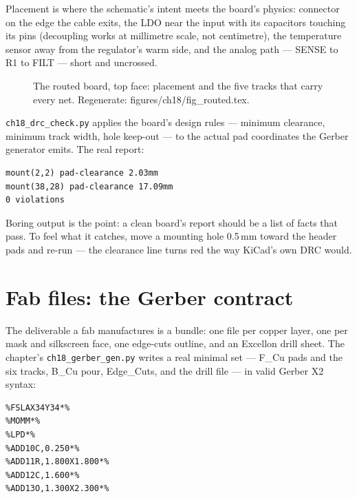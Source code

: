 Placement is where the schematic's intent meets the board's physics:
connector on the edge the cable exits, the LDO near the input with
its capacitors touching its pins (decoupling works at millimetre
scale, not centimetre), the temperature sensor away from the
regulator's warm side, and the analog path --- SENSE to R1 to FILT
--- short and uncrossed.

\begin{figure}[htbp]
\centering

\caption{The routed board, top face: placement and the five tracks
that carry every net. Regenerate: \ttfamily
figures/ch18/fig\_routed.tex.}
\label{fig:routed18}
\end{figure}

\begin{example}
\texttt{ch18\_drc\_check.py} applies the board's design rules ---
minimum clearance, minimum track width, hole keep-out --- to the
actual pad coordinates the Gerber generator emits. The real report:

\begin{lstlisting}[caption={\ttfamily ch18\_drc\_check.py output over
the real layout.}]
mount(2,2) pad-clearance 2.03mm
mount(38,28) pad-clearance 17.09mm
0 violations
\end{lstlisting}

Boring output is the point: a clean board's report should be a list
of facts that pass. To feel what it catches, move a mounting hole
0.5\,mm toward the header pads and re-run --- the clearance line
turns red the way KiCad's own DRC would.
\end{example}

\section{Fab files: the Gerber contract}\label{sec:gerber18}

\begin{example}
The deliverable a fab manufactures is a bundle: one file per copper
layer, one per mask and silkscreen face, one edge-cuts outline, and
an Excellon drill sheet. The chapter's \texttt{ch18\_gerber\_gen.py}
writes a real minimal set --- F\_Cu pads and the six tracks, B\_Cu
pour, Edge\_Cuts, and the drill file --- in valid Gerber X2 syntax:

\begin{lstlisting}[caption={\ttfamily ch18\_sensor-F\_Cu.gbr head ---
the header a Gerber viewer reads first.}]
%TF.FileFunction,Copper,L1,Top*%
%FSLAX34Y34*%
%MOMM*%
%LPD*%
%ADD10C,0.250*%
%ADD11R,1.800X1.800*%
%ADD12C,1.600*%
%ADD13O,1.300X2.300*%
\end{lstlisting}
\end{example}

